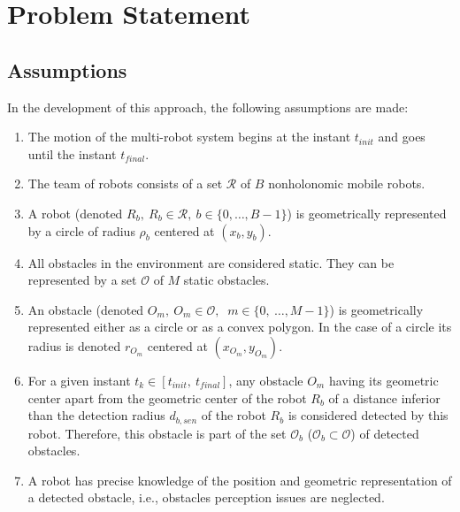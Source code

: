 \documentclass[eprint]{actapoly}
\begin{document}

\section{Problem Statement}\label{sec:problem}

\subsection{Assumptions}
In the development of this approach, the following assumptions are made:

\begin{enumerate}

    \item The motion of the multi-robot system begins at
    the instant $t_{init}$ and goes until the instant $t_{final}$.

    \item The team of robots consists of a set $\mathcal{R}$ of $B$
    nonholonomic mobile robots.
    
    \item A robot (denoted $R_b,\ R_b \in \mathcal{R},\ b \in \{0,\dots,B-1\}$) is 
    geometrically represented by a circle of radius $\rho_b$ centered at
    $(x_b, y_b)$.
        
    \item All obstacles in the environment are considered static. They can be
    represented by a set $\mathcal{O}$ of $M$ static obstacles.
    
    \item An obstacle (denoted $O_m,\ $\mbox{$O_m \in \mathcal{O}$}$,\ $
    \mbox{$m \in \{0,\ \dots, M-1\}$}) is geometrically represented either as
    a circle or as a convex polygon. In the case of a circle its radius is
    denoted $r_{O_m}$ centered at $(x_{O_m},y_{O_m})$.
    
    \item For a given instant $t_k \in [t_{init},\ t_{final}]$, any obstacle
    $O_m$ having its geometric center apart from the geometric center of the
    robot $R_b$ of a distance inferior than the detection radius $d_{b,sen}$
    of the robot $R_b$ is considered detected by this robot.
    Therefore, this obstacle is part of the set $\mathcal{O}_b$
    ($\mathcal{O}_b \subset \mathcal{O}$) of detected obstacles.
    
    \item A robot has precise knowledge of the position and geometric 
    representation of a detected obstacle, i.e., obstacles perception issues
    are neglected.
    

\end{enumerate}
\end{document}
